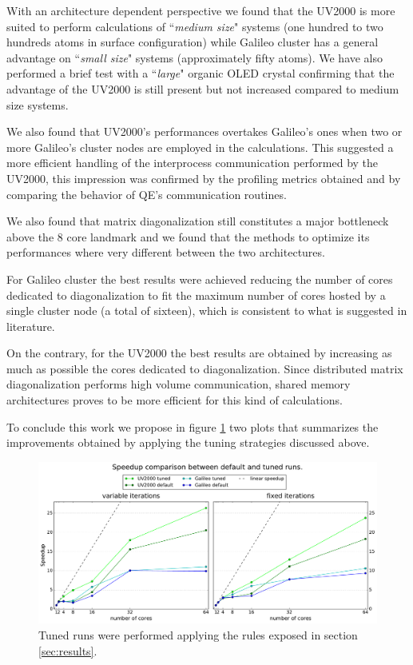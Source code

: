 \documentclass[a4paper,12pt]{article}
\begin{document}
With an architecture dependent perspective we found that the UV2000 is more suited to perform calculations of ``\textit{medium size}" systems (one hundred to two hundreds atoms in surface configuration) while Galileo cluster has a general advantage on ``\textit{small size}" systems (approximately fifty atoms).
We have also performed a brief test with a ``\textit{large}" organic OLED crystal confirming that the advantage of the UV2000 is still present but not increased compared to medium size systems.

We also found that UV2000's performances overtakes Galileo's ones when two or more Galileo's cluster nodes are employed in the calculations.
This suggested a more efficient handling of the interprocess communication performed by the UV2000, this impression was confirmed by the profiling metrics obtained and by comparing the behavior of QE's communication routines.

We also found that matrix diagonalization still constitutes a major bottleneck above the 8 core landmark and we found that the methods to optimize its performances where very different between the two architectures.

For Galileo cluster the best results were achieved reducing the number of cores dedicated to diagonalization to fit the maximum number of cores hosted by a single cluster node (a total of sixteen), which is consistent to what is suggested in literature.

On the contrary, for the UV2000 the best results are obtained by increasing as much as possible the cores dedicated to diagonalization.
Since distributed matrix diagonalization performs high volume communication, shared memory architectures proves to be more efficient for this kind of calculations.

To conclude this work we propose in figure \ref{fig:conclFinalComparison}	two plots that summarizes the improvements obtained by applying the tuning strategies discussed above.

\begin{figure}[hhh!]
\centerline{ \includegraphics[width=1.2\linewidth]{concl_final_comparison.pdf}	}
	\caption{Tuned runs were performed applying the rules exposed in section \ref{sec:results}.}
	\label{fig:conclFinalComparison}
\end{figure}
\end{document}
